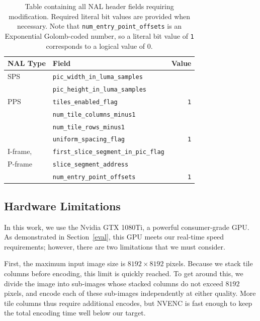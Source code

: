 \setcounter{figure}{1}
\begin{table}
	\label{tab:stitch}
	\begin{tabularx}{\columnwidth}{llr}
		\toprule
		NAL Type & Field & Value \\
		\midrule
		SPS & \texttt{pic\_width\_in\_luma\_samples} & \\
		 & \texttt{pic\_height\_in\_luma\_samples} &  \\
		\midrule
		PPS & \texttt{tiles\_enabled\_flag} & \texttt{1}  \\
		& \texttt{num\_tile\_columns\_minus1} &  \\ 
		& \texttt{num\_tile\_rows\_minus1} &  \\
		& \texttt{uniform\_spacing\_flag} & \texttt{1}  \\
		\midrule
		I-frame, & \texttt{first\_slice\_segment\_in\_pic\_flag} & \\
		P-frame & \texttt{slice\_segment\_address} &  \\
		& \texttt{num\_entry\_point\_offsets} & \texttt{1}  \\
		\bottomrule
	\end{tabularx}
	\caption{Table containing all NAL header fields requiring modification. Required literal bit values are provided when necessary. Note that \texttt{num\_entry\_point\_offsets} is an Exponential Golomb-coded number, so a literal bit value of \texttt{1} corresponds to a logical value of 0.}
\end{table}
\renewcommand{\figurename}{Fig.}
\setcounter{figure}{1}

\subsection{Hardware Limitations}

In this work, we use the Nvidia GTX 1080Ti, a powerful consumer-grade GPU. As demonstrated in Section~\ref{eval}, this GPU meets our real-time speed requirements; however, there are two limitations that we must consider.

First, the maximum input image size is $8192\times8192$ pixels. Because we stack tile columns before encoding, this limit is quickly reached. To get around this, we divide the image into sub-images whose stacked columns do not exceed $8192$ pixels, and encode each of these sub-images independently at either quality. More tile columns thus require additional encodes, but NVENC is fast enough to keep the total encoding time well below our target.

